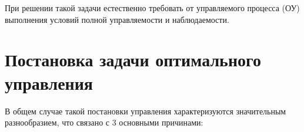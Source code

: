 \documentclass[preprint,russian,a5paper,10pt,twoside]{ncc}
\begin{document}
При решении такой задачи естественно требовать от управляемого процесса (ОУ) выполнения условий полной управляемости и наблюдаемости.


\clearpage		%

\section{Постановка задачи оптимального управления\label{task}}


В общем случае такой постановки управления характеризуются значительным разнообразием, что связано с 3 основными причинами:
\end{document}
